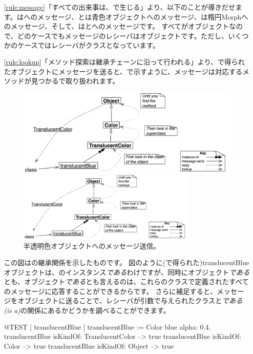 \documentclass[a4paper,10pt,twoside]{book}
\begin{document}
\ref{rule:message}「すべての出来事は、で生じる」より、以下のことが導きだせます。はへのメッセージ、とは青色オブジェクトへのメッセージ、は楕円Morphへのメッセージ、そして、はとへのメッセージです。
すべてがオブジェクトなので、どのケースでもメッセージのレシーバはオブジェクトです。ただし、いくつかのケースではレシーバがクラスとなっています。

\ref{rule:lookup}「メソッド探索は継承チェーンに沿って行われる」より、で得られたオブジェクトにメッセージを送ると、で示すように、メッセージは対応するメソッドが見つかるで取り扱われます。

\begin{center}
\begin{figure}[!ht]
\ifluluelse
	{\centerline{\includegraphics[width=\textwidth]{TranslucentClassMessage}}}
	{\centerline{\includegraphics[width=0.8\textwidth]{TranslucentClassMessage}}}
\caption{半透明色オブジェクトへのメッセージ送信。}
\end{figure}
\end{center}

この図はの継承関係を示したものです。
図のように(で得られた)translucentBlueオブジェクトは、のインスタンス\emph{である}わけですが、同時にオブジェクト\emph{である}とも、オブジェクト\emph{である}とも言えるのは、これらのクラスで定義されたすべてのメッセージに応答することができるからです。
さらに補足すると、メッセージをオブジェクトに送ることで、レシーバが引数で与えられたクラスと\emph{である(is a)}の関係にあるかどうかを調べることができます。
\begin{code}{@TEST | translucentBlue |}
translucentBlue := Color blue alpha: 0.4.
translucentBlue isKindOf: TranslucentColor --> true
translucentBlue isKindOf: Color                    --> true
translucentBlue isKindOf: Object                  --> true
\end{code}
\end{document}
